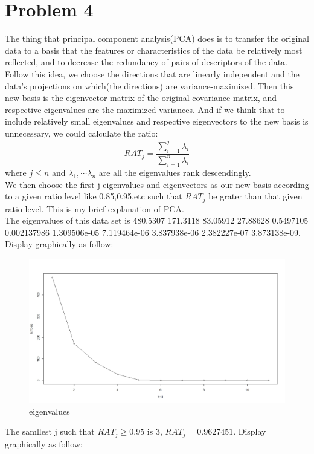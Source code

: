 \documentclass{article}
\begin{document}
\section{Problem 4}
The thing that principal component analysis(PCA) does is to transfer the original data to a basis that the features or characteristics of the data be relatively most reflected, and to decrease the redundancy of pairs of descriptors of the data. Follow this idea, we choose the directions that are linearly independent and the data's projections on which(the directions) are variance-maximized. Then this new basis is the eigenvector matrix of the original covariance matrix, and respective eigenvalues are the maximized variances. And if we think that to include relatively small eigenvalues and respective eigenvectors to the new basis is unnecessary, we could calculate the ratio:\[RAT_{j}=\frac{\sum\limits_{i=1}^{j}\lambda_{i}}{\sum\limits_{i=1}^{n}\lambda_{i}}\] where $j\leq n$ and $\lambda_{1},\cdots \lambda_{n}$ are all the eigenvalues rank descendingly.\\ We then choose the first j eigenvalues and eigenvectors as our new basis according to a given ratio level like 0.85,0.95,etc such that $RAT_{j}$ be grater than that given ratio level. This is my brief explanation of PCA.\\
The eigenvalues of this data set is 480.5307 171.3118 83.05912 27.88628 0.5497105 0.002137986 1.309506e-05 7.119464e-06 3.837938e-06 2.382227e-07 3.873138e-09. Display graphically as follow:
  \begin{figure}[H]
  \centering
  \includegraphics[width=1.0\textwidth]{lambda.jpg}
  \caption{eigenvalues}\label{}
  \end{figure}
The samllest j such that $RAT_{j}\geq0.95$ is 3, $RAT_{j}=0.9627451$. Display graphically as follow:
\end{document}
